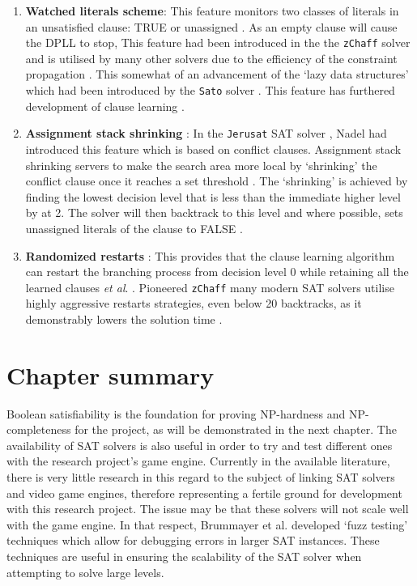 \documentclass[11pt, a4paper, oneside]{report} %
\begin{document}
\begin{enumerate}
  \item \textbf{Watched literals scheme}:  This feature monitors two classes of literals in an
unsatisfied clause: TRUE or unassigned \cite{moskewicz2001chaff}. As an empty clause will cause the
DPLL to stop, This feature had been introduced in the the \texttt{zChaff} solver and is utilised by
many other solvers due to the efficiency of the constraint propagation
\cite{gomes2008satisfiability}. This somewhat of an advancement of the `lazy data structures' which
had been introduced by the \texttt{Sato} solver \cite{zhang1997sato}. This feature has furthered
development of clause learning \cite{zhang2002quest,gomes2008satisfiability}.


  \item \textbf{Assignment stack shrinking} : In the \texttt{Jerusat} SAT solver \cite{nadel2002jerusat},
Nadel had introduced this feature which is based on conflict clauses. Assignment stack shrinking
servers to make the search area more local by `shrinking' the conflict clause once it reaches a set
threshold \cite{Nadel:2010:ASS:2164073.2164111}. The `shrinking' is achieved by finding the lowest
decision level that is less than the immediate higher level by at 2. The solver will then backtrack
to this level and where possible, sets unassigned literals of the clause to FALSE
\cite{Nadel:2010:ASS:2164073.2164111}.


  \item \textbf{Randomized restarts} : This provides that the clause learning algorithm can restart
  the branching process from decision level 0 while retaining all the learned clauses \textit{et
  al}. \cite{gomes1998boosting}. Pioneered \texttt{zChaff} \cite{moskewicz2001chaff} many modern
  SAT solvers utilise highly aggressive restarts strategies, even below 20 backtracks, as it
  demonstrably lowers the solution time \cite{gomes2008satisfiability}.

\end{enumerate}


\section{Chapter summary}

Boolean satisfiability is the foundation for proving NP-hardness and NP-completeness for the
project, as will be demonstrated in the next chapter. The availability of SAT solvers is also useful
in order to try and test different ones with the research project's game engine. Currently in the
available literature, there is very little research in this regard to the subject of linking SAT
solvers and video game engines, therefore representing a fertile ground for development with this
research project. The issue may be that these solvers will not scale well with the game engine. In
that respect, Brummayer et al. \cite{brummayer2010automated} developed `fuzz testing' techniques
which allow for debugging errors in larger SAT instances. These techniques are useful in ensuring
the scalability of the SAT solver when attempting to solve large levels.
\end{document}
